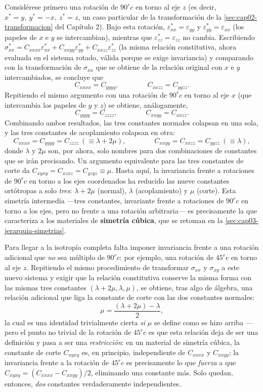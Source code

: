 Considérese primero una rotación de $90^	rc$ en torno al eje $z$ (es decir, $x^{*}=y,\ y^{*}=-x,\ z^{*}=z$, un caso particular de la transformación de la \cref{sec:cap02-transformacion} del Capítulo 2). Bajo esta rotación, $\varepsilon^{*}_{xx}=\varepsilon_{yy}$ y $\varepsilon^{*}_{yy}=\varepsilon_{xx}$ (los papeles de $x$ e $y$ se intercambian), mientras que $\varepsilon^{*}_{zz}=\varepsilon_{zz}$ no cambia. Escribiendo $\sigma^{*}_{xx}=C_{xxxx}\varepsilon^{*}_{xx}+C_{xxyy}\varepsilon^{*}_{yy}+C_{xxzz}\varepsilon^{*}_{zz}$ (la misma relación constitutiva, ahora evaluada en el sistema rotado, válida porque se exige invariancia) y comparando con la transformación de $\sigma_{xx}$ que se obtiene de la relación original con $x$ e $y$ intercambiados, se concluye que
\[
C_{xxxx} = C_{yyyy}, \qquad\qquad C_{xxzz} = C_{yyzz}.
\]
Repitiendo el mismo argumento con una rotación de $90^	rc$ en torno al eje $x$ (que intercambia los papeles de $y$ y $z$) se obtiene, análogamente,
\[
C_{yyyy} = C_{zzzz}, \qquad\qquad C_{xxyy} = C_{xxzz}.
\]
Combinando ambos resultados, las tres constantes normales colapsan en una sola, y las tres constantes de acoplamiento colapsan en otra:
\[
C_{xxxx}=C_{yyyy}=C_{zzzz} \ (\equiv \lambda+2\mu), \qquad\qquad C_{xxyy}=C_{xxzz}=C_{yyzz} \ (\equiv \lambda),
\]
donde $\lambda$ y $2\mu$ son, por ahora, solo nombres para dos combinaciones de constantes que se irán precisando. Un argumento equivalente para las tres constantes de corte da $C_{xyxy}=C_{xzxz}=C_{yzyz}\equiv\mu$. Hasta aquí, la invariancia frente a rotaciones de $90^	rc$ en torno a los ejes coordenados ha reducido las nueve constantes ortótropas a solo \emph{tres}: $\lambda+2\mu$ (normal), $\lambda$ (acoplamiento) y $\mu$ (corte). Esta simetría intermedia —tres constantes, invariante frente a rotaciones de $90^	rc$ en torno a los ejes, pero no frente a una rotación arbitraria— es precisamente la que caracteriza a los materiales de \textbf{simetría cúbica}, que se retoman en la \cref{sec:cap03-jerarquia-simetrias}.

Para llegar a la isotropía completa falta imponer invariancia frente a una rotación adicional que \emph{no} sea múltiplo de $90^	rc$: por ejemplo, una rotación de $45^	rc$ en torno al eje $z$. Repitiendo el mismo procedimiento de transformar $\sigma_{xx}$ y $\sigma_{xy}$ a este nuevo sistema y exigir que la relación constitutiva conserve la misma forma con las mismas tres constantes $(\lambda+2\mu,\lambda,\mu)$, se obtiene, tras algo de álgebra, una relación adicional que liga la constante de corte con las dos constantes normales:
\[
\mu = \frac{(\lambda+2\mu)-\lambda}{2},
\]
la cual es una identidad trivialmente cierta \emph{si} $\mu$ se define como se hizo arriba —pero el punto no trivial de la rotación de $45^	rc$ es que esta relación deja de ser una definición y pasa a ser una \emph{restricción}: en un material de simetría cúbica, la constante de corte $C_{xyxy}$ es, en principio, independiente de $C_{xxxx}$ y $C_{xxyy}$; la invariancia frente a la rotación de $45^	rc$ es precisamente lo que \emph{fuerza} a que $C_{xyxy}=\left(C_{xxxx}-C_{xxyy}\right)/2$, eliminando una constante más. Solo quedan, entonces, \emph{dos} constantes verdaderamente independientes.

